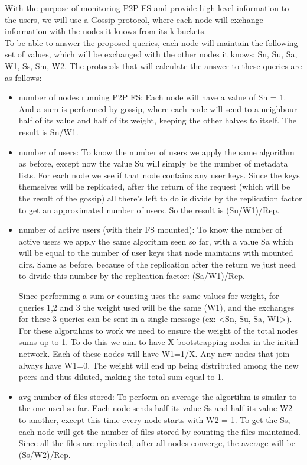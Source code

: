 \documentclass[times,9pt,article]{llncs}
\begin{document}
With the purpose of monitoring P2P FS and provide high level information to the 
users, we will use a Gossip protocol, where each node will exchange information
with the nodes it knows from its k-buckets.\\
To be able to answer the proposed queries, each node will maintain the following
set of values, which will be exchanged with the other nodes it knows: Sn, Su, Sa,
W1, Ss, Sm, W2. The protocols that will calculate the answer to these queries are
as follows:
\begin{itemize}
\item number of nodes running P2P FS:
Each node will have a value of Sn = 1. And a sum is performed by gossip, where each 
node will send to a neighbour half of its value and half of its weight, keeping the 
other halves to itself. The result is Sn/W1.

\item number of users:
To know the number of users we apply the same algorithm as before, except now 
the value Su will simply be the number of metadata lists. For each node we see if
that node contains any user keys. Since the keys themselves will be replicated,
 after the return of the request (which will be the result of the gossip) all
 there's left to do is divide by the replication factor to get an approximated
 number of users. So the result is (Su/W1)/Rep.

\item number of active users (with their FS mounted):
To know the number of active users we apply the same algorithm seen so far, with a
value Sa which will be equal to the number of user keys that node maintains with
mounted dirs. Same as before, because of the replication after the return
we just need to divide this number by the replication factor: (Sa/W1)/Rep.

Since performing a sum or counting uses the same values for weight, for queries 1,2 
and 3 the weight used will be the same (W1), and the exchanges for these 3 queries 
can be sent in a single message (ex: \textless Sn, Su, Sa, W1\textgreater). For these algortihms to work 
we need to ensure the weight of the total nodes sums up to 1. To do this we aim to
have X bootstrapping nodes in the initial network. Each of these nodes will have 
W1=1/X. 
Any new nodes that join always have W1=0. The weight will end up being distributed 
among the new peers and thus diluted, making the total sum equal to 1.

\item avg number of files stored:
To perform an average the algortihm is similar to the one used so far. Each node
sends half its value Ss and half its value W2 to another, except this time every 
node starts with W2 = 1. To get the Ss, each node will get the number of files 
stored by counting the files maintained. Since all the files are replicated, after
all nodes converge, the average will be (Ss/W2)/Rep.


\end{itemize}
\end{document}

